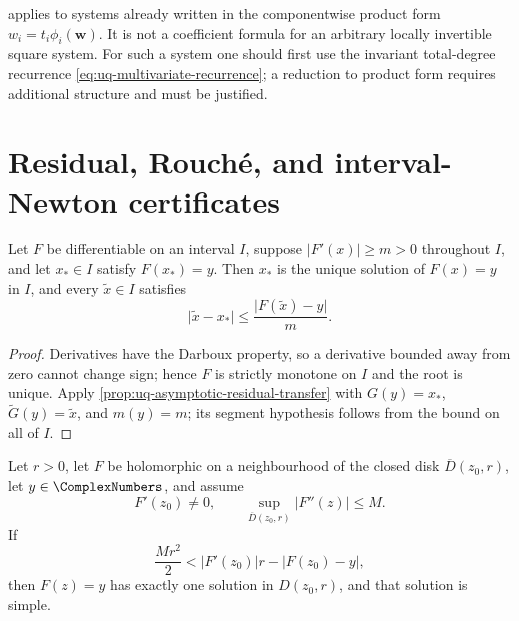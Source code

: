 \begin{remark}
\label{rem:uq-good-scope}
 applies to systems already written in the
componentwise product form \(w_i=t_i\phi_i(\bm w)\).  It is not a
coefficient formula for an arbitrary locally invertible square system.
For such a system one should first use the invariant total-degree recurrence
\eqref{eq:uq-multivariate-recurrence}; a reduction to product form requires
additional structure and must be justified.
\end{remark}

\section{Residual, Rouch\'e, and interval-Newton certificates}
\label{sec:uq-certificates}

\begin{proposition}
\label{prop:uq-real-residual-certificate}
Let \(F\) be differentiable on an interval \(I\), suppose
\(\lvert F'(x)\rvert\ge m>0\) throughout \(I\), and let \(x_*\in I\) satisfy
\(F(x_*)=y\).  Then \(x_*\) is the unique solution of \(F(x)=y\) in \(I\),
and every \(\widetilde x\in I\) satisfies
\[
 \lvert\widetilde x-x_*\rvert
 \le\frac{\lvert F(\widetilde x)-y\rvert}{m}.
\]
\end{proposition}

\begin{proof}
Derivatives have the Darboux property, so a derivative bounded away from zero
cannot change sign; hence \(F\) is strictly monotone on \(I\) and the root is
unique.  Apply \cref{prop:uq-asymptotic-residual-transfer} with
\(G(y)=x_*\), \(\widetilde G(y)=\widetilde x\), and \(m(y)=m\); its segment
hypothesis follows from the bound on all of \(I\).
\end{proof}

\begin{theorem}
\label{thm:uq-rouche-disk-certificate}
Let \(r>0\), let \(F\) be holomorphic on a neighbourhood of the closed disk
\(\overline D(z_0,r)\), let \(y\in\ComplexNumbers\), and assume
\[
 F'(z_0)\ne0,\qquad
 \sup_{\overline D(z_0,r)}\lvert F''(z)\rvert\le M.
\]
If
\begin{equation}
\label{eq:uq-rouche-condition}
 \frac{Mr^2}{2}
 <
 \lvert F'(z_0)\rvert r-\lvert F(z_0)-y\rvert,
\end{equation}
then \(F(z)=y\) has exactly one solution in \(D(z_0,r)\), and that solution
is simple.
\end{theorem}

